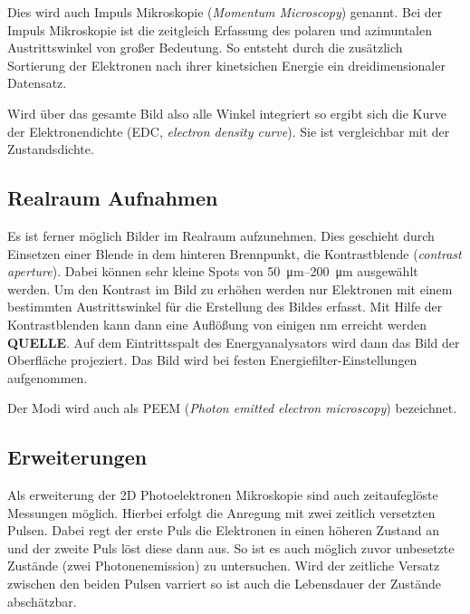             Dies wird auch Impuls Mikroskopie (\textit{Momentum Microscopy}) genannt.
            Bei der Impuls Mikroskopie ist die zeitgleich Erfassung des polaren und azimuntalen Austrittswinkel von großer Bedeutung. 
            So entsteht durch die zusätzlich Sortierung der Elektronen nach ihrer kinetsichen Energie ein dreidimensionaler Datensatz.

            Wird über das gesamte Bild also alle Winkel integriert so ergibt sich die Kurve der Elektronendichte (EDC, \textit{electron density curve}).
            Sie ist vergleichbar mit der Zustandsdichte.

        \subsection{Realraum Aufnahmen}
            Es ist ferner möglich Bilder im Realraum aufzunehmen.
            Dies geschieht durch Einsetzen einer Blende in dem hinteren Brennpunkt, die Kontrastblende (\textit{contrast aperture}).
            Dabei können sehr kleine Spots von \SIrange{50}{200}{\micro\meter} ausgewählt werden.
            Um den Kontrast im Bild zu erhöhen werden nur Elektronen mit einem bestimmten Austrittswinkel für die Erstellung des Bildes erfasst.
            Mit Hilfe der Kontrastblenden kann dann eine Auflößung von einigen \si{\nano\meter} erreicht werden \textbf{QUELLE}. 
            Auf dem Eintrittsspalt des Energyanalysators wird dann das Bild der Oberfläche projeziert.
            Das Bild wird bei festen Energiefilter-Einstellungen aufgenommen.

            Der Modi wird auch als PEEM (\textit{Photon emitted electron microscopy}) bezeichnet.

        
        
        \subsection{Erweiterungen}
            Als erweiterung der 2D Photoelektronen Mikroskopie sind auch zeitaufeglöste Messungen möglich.
            Hierbei erfolgt die Anregung mit zwei zeitlich versetzten Pulsen. 
            Dabei regt der erste Puls die Elektronen in einen höheren Zustand an und der zweite Puls löst diese dann aus.
            So ist es auch möglich zuvor unbesetzte Zustände (zwei Photonenemission) zu untersuchen.
            Wird der zeitliche Versatz zwischen den beiden Pulsen varriert so ist auch die Lebensdauer der Zustände abschätzbar.

